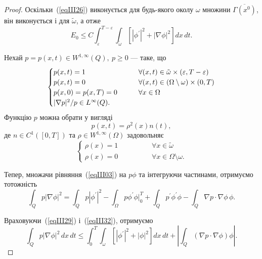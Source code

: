 \begin{proof}
Оскільки~(\ref{eqIII26}) виконується для будь-якого околу $\omega$ множини $\overline{\Gamma(x^0)}$, він виконується і для $\tilde{\omega}$, а отже
\begin{equation}\label{eqIII28}
    E_0 \leq C \int^{T-\varepsilon}_\varepsilon \int_{\tilde{\omega}} \left[|\phi^\prime|^2 + |\nabla \phi|^2\right] dx\, dt.
\end{equation}

Нехай $p = p(x,t) \in W^{1,\infty}(Q),\ p \geq 0$ — таке, що
\begin{equation}\label{eqIII29}
\begin{cases}
p(x,t) = 1 & \hspace{0.7cm} \forall(x,t) \in \tilde{\omega} \times (\varepsilon, T-\varepsilon)
\\
p(x,t) = 0 & \hspace{0.7cm} \forall(x,t) \in (\Omega \setminus \omega) \times (0,T)
\\
p(x,0) = p(x,T) = 0 & \hspace{0.7cm} \forall x \in \Omega
\\
|\nabla p|^2/p \in L^\infty(Q).
\end{cases}
\end{equation}
Функцію $p$ можна обрати у вигляді
\begin{equation}\label{eqIII30}
    p(x,t) = \rho^2(x) n(t),
\end{equation}
де $n \in C^1([0,T])$ та $\rho \in W^{1, \infty}(\Omega)$ задовольняє
\begin{equation}\label{eqIII31}
    \begin{cases}
    \rho(x) = 1 \hspace{2cm} \forall x \in \tilde{\omega}
    \\
    \rho(x) = 0 \hspace{2cm} \forall x \in \Omega \setminus \omega.
    \end{cases}
\end{equation}

Тепер, множачи рівняння~(\ref{eqIII03}) на $p\phi$ та інтегруючи частинами, отримуємо тотожність
\begin{equation}\label{eqIII32}
    \int_Q p |\nabla \phi|^2 = \int_Q p|\phi^\prime|^2
    - \int_\Omega p \phi^\prime \phi\bigg|^T_0
    + \int_Q p^\prime \phi^\prime \phi - \int_Q \nabla p \cdot \nabla \phi\, \phi.
\end{equation}

Враховуючи~(\ref{eqIII29}) і~(\ref{eqIII32}), отримуємо
\begin{equation}\label{eqIII33}
    \int_Q p |\nabla \phi|^2\, dx\, dt \leq \int^T_0 \int_\omega \left[|\phi^\prime|^2 + |\phi|^2\right] dx\, dt
    + \left|\int_Q (\nabla p \cdot \nabla \phi)\phi\right|.
\end{equation}


\end{proof}
